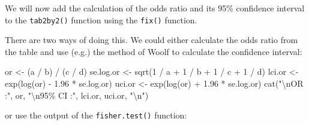 \documentclass[
  12pt,
]{book}
\newenvironment{Shaded}{\begin{snugshade}}{\end{snugshade}}
\newcommand{\DecValTok}[1]{\textcolor[rgb]{0.00,0.00,0.81}{#1}}
\newcommand{\FloatTok}[1]{\textcolor[rgb]{0.00,0.00,0.81}{#1}}
\newcommand{\FunctionTok}[1]{\textcolor[rgb]{0.00,0.00,0.00}{#1}}
\newcommand{\NormalTok}[1]{#1}
\newcommand{\OtherTok}[1]{\textcolor[rgb]{0.56,0.35,0.01}{#1}}
\newcommand{\SpecialCharTok}[1]{\textcolor[rgb]{0.00,0.00,0.00}{#1}}
\newcommand{\StringTok}[1]{\textcolor[rgb]{0.31,0.60,0.02}{#1}}
\begin{document}
We will now add the calculation of the odds ratio and its 95\% confidence interval to the \texttt{tab2by2()} function using the \texttt{fix()} function.

There are two ways of doing this. We could either calculate the odds ratio from the table and use (e.g.) the method of Woolf to calculate the confidence interval:

\begin{Shaded}
\begin{Highlighting}[]
\NormalTok{or }\OtherTok{\textless{}{-}}\NormalTok{ (a }\SpecialCharTok{/}\NormalTok{ b) }\SpecialCharTok{/}\NormalTok{ (c }\SpecialCharTok{/}\NormalTok{ d)}
\NormalTok{se.log.or }\OtherTok{\textless{}{-}} \FunctionTok{sqrt}\NormalTok{(}\DecValTok{1} \SpecialCharTok{/}\NormalTok{ a }\SpecialCharTok{+} \DecValTok{1} \SpecialCharTok{/}\NormalTok{ b }\SpecialCharTok{+} \DecValTok{1} \SpecialCharTok{/}\NormalTok{ c }\SpecialCharTok{+} \DecValTok{1} \SpecialCharTok{/}\NormalTok{ d)}
\NormalTok{lci.or }\OtherTok{\textless{}{-}} \FunctionTok{exp}\NormalTok{(}\FunctionTok{log}\NormalTok{(or) }\SpecialCharTok{{-}} \FloatTok{1.96} \SpecialCharTok{*}\NormalTok{ se.log.or)}
\NormalTok{uci.or }\OtherTok{\textless{}{-}} \FunctionTok{exp}\NormalTok{(}\FunctionTok{log}\NormalTok{(or) }\SpecialCharTok{+} \FloatTok{1.96} \SpecialCharTok{*}\NormalTok{ se.log.or)}
\FunctionTok{cat}\NormalTok{(}\StringTok{"}\SpecialCharTok{\textbackslash{}n}\StringTok{OR     :"}\NormalTok{, or,}
    \StringTok{"}\SpecialCharTok{\textbackslash{}n}\StringTok{95\% CI :"}\NormalTok{, lci.or, uci.or, }\StringTok{"}\SpecialCharTok{\textbackslash{}n}\StringTok{"}\NormalTok{)}
\end{Highlighting}
\end{Shaded}

or use the output of the \texttt{fisher.test()} function:

\begin{Shaded}
\end{Shaded}
\end{document}
